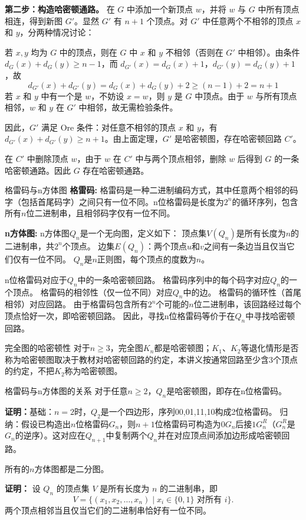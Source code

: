 \documentclass[lang=cn,11pt]{elegantbook}
\begin{document}
    \textbf{第二步：构造哈密顿通路。}
    在 $G$ 中添加一个新顶点 $w$，并将 $w$ 与 $G$ 中所有顶点相连，得到新图 $G'$。显然 $G'$ 有 $n+1$ 个顶点。对 $G'$ 中任意两个不相邻的顶点 $x$ 和 $y$，分两种情况讨论：
         
    若 $x, y$ 均为 $G$ 中的顶点，则在 $G$ 中 $x$ 和 $y$ 不相邻（否则在 $G'$ 中相邻）。由条件 $d_G(x) + d_G(y) \ge n-1$，而 $d_{G'}(x) = d_G(x) + 1$，$d_{G'}(y) = d_G(y) + 1$，故
        \[
        d_{G'}(x) + d_{G'}(y) = d_G(x) + d_G(y) + 2 \ge (n-1) + 2 = n+1
        \]
         若 $x$ 和 $y$ 中有一个是 $w$，不妨设 $x = w$，则 $y$ 是 $G$ 中顶点。由于 $w$ 与所有顶点相邻，$w$ 和 $y$ 在 $G'$ 中相邻，故无需检验条件。

    因此，$G'$ 满足 Ore 条件：对任意不相邻的顶点 $x$ 和 $y$，有 $d_{G'}(x) + d_{G'}(y) \ge n+1$。由上面定理，$G'$ 是哈密顿图，存在哈密顿回路 $C'$。

    在 $C'$ 中删除顶点 $w$，由于 $w$ 在 $C'$ 中与两个顶点相邻，删除 $w$ 后得到 $G$ 的一条哈密顿通路。因此 $G$ 存在哈密顿通路。
\begin{definition}{格雷码与n方体图}
\textbf{格雷码:}
格雷码是一种二进制编码方式，其中任意两个相邻的码字（包括首尾码字）之间只有一位不同。n位格雷码是长度为$2^n$的循环序列，包含所有$n$位二进制串，且相邻码字仅有一位不同。

\textbf{n方体图:}
n方体图$Q_n$是一个无向图，定义如下：
顶点集$V(Q_n)$是所有长度为$n$的二进制串，共$2^n$个顶点。  
边集$E(Q_n)$：两个顶点$u$和$v$之间有一条边当且仅当它们仅有一位不同。  
$Q_n$是$n$正则图，每个顶点的度数为$n$。
\end{definition}
n位格雷码对应于$Q_n$中的一条哈密顿回路。  
格雷码序列中的每个码字对应$Q_n$的一个顶点。  
格雷码的相邻性（仅一位不同）对应$Q_n$中的边。  
格雷码的循环性（首尾相邻）对应回路。  
由于格雷码包含所有$2^n$个可能的$n$位二进制串，该回路经过每个顶点恰好一次，即哈密顿回路。  
因此，寻找n位格雷码等价于在$Q_n$中寻找哈密顿回路。
\begin{theorem}{完全图的哈密顿性}
    对于$n\geqslant3$，完全图$K_n$都是哈密顿图；$K_1$、$K_2$等退化情形是否称为哈密顿图取决于教材对哈密顿回路的约定，本讲义按通常回路至少含3个顶点的约定，不把$K_2$称为哈密顿图。
\end{theorem}
\begin{theorem}{格雷码与n方体图的关系}
    对于任意$n \geqslant 2$，$Q_n$是哈密顿图，即存在n位格雷码。
\end{theorem}
\textbf{证明：}基础：$n=2$时，$Q_2$是一个四边形，序列00,01,11,10构成2位格雷码。  
归纳：假设已构造出$n$位格雷码$G_n$，则$n+1$位格雷码可构造为$0G_n$后接$1G_n^R$（$G_n^R$是$G_n$的逆序）。这对应在$Q_{n+1}$中复制两个$Q_n$并在对应顶点间添加边形成哈密顿回路。
\begin{theorem}
    所有的$n$方体图都是二分图。
\end{theorem}
\textbf{证明：}
    设 $Q_n$ 的顶点集 $V$ 是所有长度为 $n$ 的二进制串，即
    \[
    V = \{ (x_1, x_2, \dots, x_n) \mid x_i \in \{0, 1\} \text{ 对所有 } i \}.
    \]
    两个顶点相邻当且仅当它们的二进制串恰好有一位不同。
\end{document}
